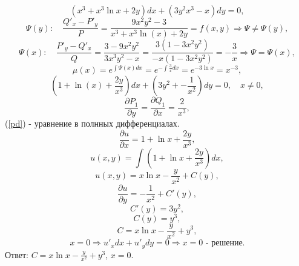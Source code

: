 \documentclass[11pt, a4paper]{article}
\begin{document}
	\par
	\begin{equation*}
    	(x^3+x^3\ln{x}+2y)dx+(3y^2x^3-x)dy=0,
	\end{equation*}
	\begin{equation*}
    	\Psi(y): \quad \frac{Q'_x-P'_y}{P}=\frac{9x^2y^2-3}{x^3+x^3\ln(x)+2y}=f(x,y) \Rightarrow \Psi\neq\Psi(y),
	\end{equation*}
	\begin{equation*}
    	\Psi(x): \quad \frac{P'_y-Q'_x}{Q}=\frac{3-9x^2y^2}{3x^3y^2-x}=\frac{3(1-3x^2y^2)}{-x(1-3x^2y^2)}=-\frac{3}{x}\Rightarrow \Psi=\Psi(x),
	\end{equation*}
	\begin{equation*}
    	\mu(x)=e^{\int\Psi(x)dx}=e^{-\int\frac{3}{x}dx}=e^{-3\ln x}=x^{-3},
	\end{equation*}
	\begin{equation}
    	\left(1+\ln(x)+\frac{2y}{x^3}\right)dx+\left(3y^2+-\frac{1}{x^2}\right)dy=0 \label{pd},\quad x \neq 0,
	\end{equation}
	\begin{equation*}
    	\frac{\partial P_1}{\partial y}=\frac{\partial Q_1}{\partial x}=\frac{2}{x^3},
	\end{equation*}
	(\ref{pd}) - уравнение в полнных дифференциалах.
	\begin{equation*}
    	\frac{\partial u}{\partial x} = 1+\ln x+\frac{2y}{x^3},
	\end{equation*}
	\begin{equation*}
    	u(x,y)= \int \left(1+\ln x+\frac{2y}{x^3}\right)dx,
	\end{equation*}
	\begin{equation*}
    	u(x,y)= x\ln x-\frac{y}{x^2}+C(y),
	\end{equation*}
	\begin{equation*}
    	\frac{\partial u}{\partial y} = -\frac{1}{x^2}+C'(y),
	\end{equation*}
	\begin{equation*}
    	C'(y)=3y^2,
	\end{equation*}
	\begin{equation*}
    	C(y)=y^3,
	\end{equation*}
	\begin{equation*}
   		C=x\ln x-\frac{y}{x^2}+y^3,
	\end{equation*}
	\begin{equation*}
    	x=0 \Rightarrow  u'_xdx+u'_ydy=0 \Rightarrow x=0\text{ - решение.}  
	\end{equation*}
	Ответ: $C=x\ln x-\frac{y}{x^2}+y^3$, $x=0$.
	
\end{document}
